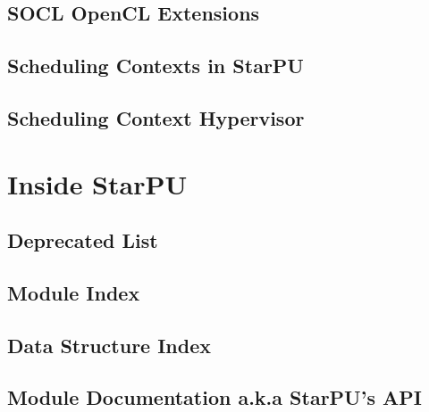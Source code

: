 \documentclass{book}
\begin{document}
\chapter{SOCL OpenCL Extensions}
\label{soclOpenclExtensions}
\hypertarget{soclOpenclExtensions}{}


\chapter{Scheduling Contexts in StarPU}
\label{schedulingContexts}
\hypertarget{schedulingContexts}{}


\chapter{Scheduling Context Hypervisor}
\label{schedulingContextHypervisor}
\hypertarget{schedulingContextHypervisor}{}


\part{Inside StarPU}

\chapter{Deprecated List}
\label{deprecated}
\hypertarget{deprecated}{}


\chapter{Module Index}

\chapter{Data Structure Index}


\chapter{Module Documentation a.k.a StarPU's API}


















\end{document}
